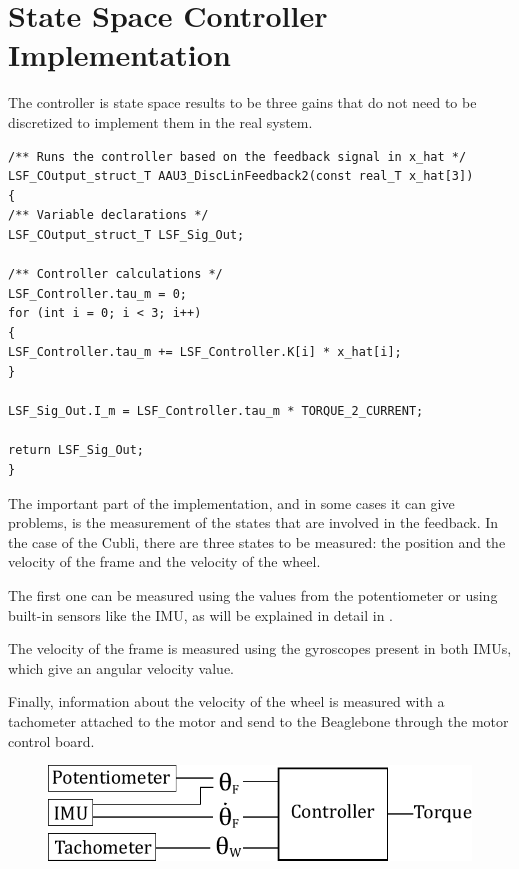 \section{State Space Controller Implementation}\label{sec:SSImplementation}
The controller is state space results to be three gains that do not need to be discretized to implement them in the real system.  
\begin{lstlisting}[caption  = {Code for the implementation of the State Space Controller. The feedback from the cubli is contained in the array x\_hat.},
label    = codeStateSpaceControl ]
/** Runs the controller based on the feedback signal in x_hat */
LSF_COutput_struct_T AAU3_DiscLinFeedback2(const real_T x_hat[3])
{
/** Variable declarations */
LSF_COutput_struct_T LSF_Sig_Out;

/** Controller calculations */
LSF_Controller.tau_m = 0;
for (int i = 0; i < 3; i++)
{
LSF_Controller.tau_m += LSF_Controller.K[i] * x_hat[i];
}

LSF_Sig_Out.I_m = LSF_Controller.tau_m * TORQUE_2_CURRENT;

return LSF_Sig_Out;
}
\end{lstlisting}
The important part of the implementation, and in some cases it can give problems, is the measurement of the states that are involved in the feedback.
In the case of the Cubli, there are three states to be measured: the position and the velocity of the frame and the velocity of the wheel.

The first one can be measured using the values from the potentiometer or using built-in sensors like the IMU, as will be explained in detail in .

The velocity of the frame is measured using the gyroscopes present in both IMUs, which give an angular velocity value.

Finally, information about the velocity of the wheel is measured with a tachometer attached to the motor and send to the Beaglebone through the motor control board. 
\\
\begin{figure}[H]\vspace{-4mm}
	\centering
	\includegraphics[scale=.75]{figures/measurements}
	\label{fig:measurements}
\end{figure}\vspace{-5mm}
